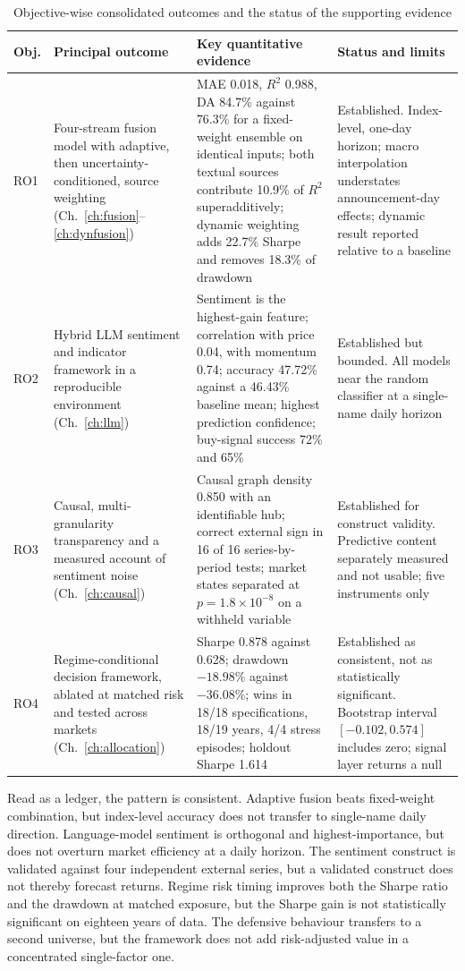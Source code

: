 \begin{table}[!htb]
\centering
\caption[Objective-wise consolidated outcomes and evidence status]{Objective-wise consolidated
outcomes and the status of the supporting evidence}
\label{tab:outcomes}
\tabfont
\begin{tabular}{@{}L{0.9cm}L{3.9cm}L{4.6cm}L{4.4cm}@{}}
\toprule
\textbf{Obj.} & \textbf{Principal outcome} & \textbf{Key quantitative evidence} &
\textbf{Status and limits} \\
\midrule
RO1 & Four-stream fusion model with adaptive, then uncertainty-conditioned, source weighting
(Ch.~\ref{ch:fusion}--\ref{ch:dynfusion}) & MAE 0.018, $R^2$ 0.988, DA 84.7\% against 76.3\% for a
fixed-weight ensemble on identical inputs; both textual sources contribute 10.9\% of $R^2$
superadditively; dynamic weighting adds 22.7\% Sharpe and removes 18.3\% of drawdown &
Established. Index-level, one-day horizon; macro interpolation understates announcement-day
effects; dynamic result reported relative to a baseline \\
RO2 & Hybrid LLM sentiment and indicator framework in a reproducible environment
(Ch.~\ref{ch:llm}) & Sentiment is the highest-gain feature; correlation with price 0.04, with
momentum 0.74; accuracy 47.72\% against a 46.43\% baseline mean; highest prediction confidence;
buy-signal success 72\% and 65\% & Established but bounded. All models near the random classifier
at a single-name daily horizon \\
RO3 & Causal, multi-granularity transparency and a measured account of sentiment noise
(Ch.~\ref{ch:causal}) & Causal graph density 0.850 with an identifiable hub; correct external sign
in 16 of 16 series-by-period tests; market states separated at $p=1.8\times10^{-8}$ on a withheld
variable & Established for construct validity. Predictive content separately measured and not
usable; five instruments only \\
RO4 & Regime-conditional decision framework, ablated at matched risk and tested across markets
(Ch.~\ref{ch:allocation}) & Sharpe 0.878 against 0.628; drawdown $-18.98\%$ against $-36.08\%$;
wins in 18/18 specifications, 18/19 years, 4/4 stress episodes; holdout Sharpe 1.614 & Established
as consistent, not as statistically significant. Bootstrap interval $[-0.102, 0.574]$ includes
zero; signal layer returns a null \\
\bottomrule
\end{tabular}
\end{table}

Read as a ledger, the pattern is consistent. Adaptive fusion beats fixed-weight combination, but
index-level accuracy does not transfer to single-name daily direction. Language-model sentiment is
orthogonal and highest-importance, but does not overturn market efficiency at a daily horizon. The
sentiment construct is validated against four independent external series, but a validated
construct does not thereby forecast returns. Regime risk timing improves both the Sharpe ratio and
the drawdown at matched exposure, but the Sharpe gain is not statistically significant on eighteen
years of data. The defensive behaviour transfers to a second universe, but the framework does not
add risk-adjusted value in a concentrated single-factor one.

